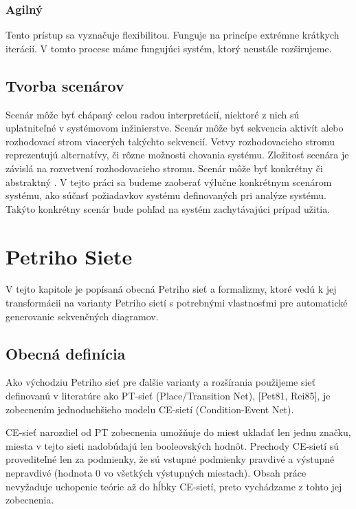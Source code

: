 \subsection{Agilný}
Tento prístup sa vyznačuje flexibilitou. Funguje na princípe extrémne krátkych iterácií. V tomto procese máme fungujúci systém, ktorý neustále rozširujeme. 

\section{Tvorba scenárov} 

Scenár môže byť chápaný celou radou interpretácií, niektoré z nich sú uplatniteľné v systémovom inžinierstve. Scenár môže byť sekvencia aktivít alebo rozhodovací strom viacerých takýchto sekvencií. Vetvy rozhodovacieho stromu reprezentujú alternatívy, či rôzne možnosti chovania systému. Zložitosť scenára je závislá na rozvetvení rozhodovacieho stromu. Scenár môže byť konkrétny či abstraktný \cite{scenarios}. V tejto práci sa budeme zaoberať výlučne konkrétnym scenárom systému, ako súčasť požiadavkov systému definovaných pri analýze systému. Takýto konkrétny scenár bude pohľad na systém zachytávajúci prípad užitia.


\chapter{Petriho Siete}
V tejto kapitole je popísaná obecná Petriho sieť a formalizmy, ktoré vedú k jej transformácii na varianty Petriho sietí s potrebnými vlastnosťmi pre automatické generovanie sekvenčných diagramov.

\section{Obecná definícia}
Ako východziu Petriho sieť pre ďalšie varianty a rozšírania použijeme sieť definovanú v literatúre ako PT-sieť (Place/Transition Net), [Pet81, Rei85], je zobecnením jednoduchšieho modelu CE-sietí (Condition-Event Net).

\begin{note}
	CE-sieť narozdiel od PT zobecnenia umožňuje do miest ukladať len jednu značku, miesta v tejto sieti nadobúdajú len booleovských hodnôt. Prechody CE-sietí sú provediteľné len za podmienky, že sú vstupné podmienky pravdivé a výstupné nepravdivé (hodnota 0 vo všetkých výstupných miestach). Obsah práce nevyžaduje uchopenie teórie až do hĺbky CE-sietí, preto vychádzame z tohto jej zobecnenia. 
\end{note}

